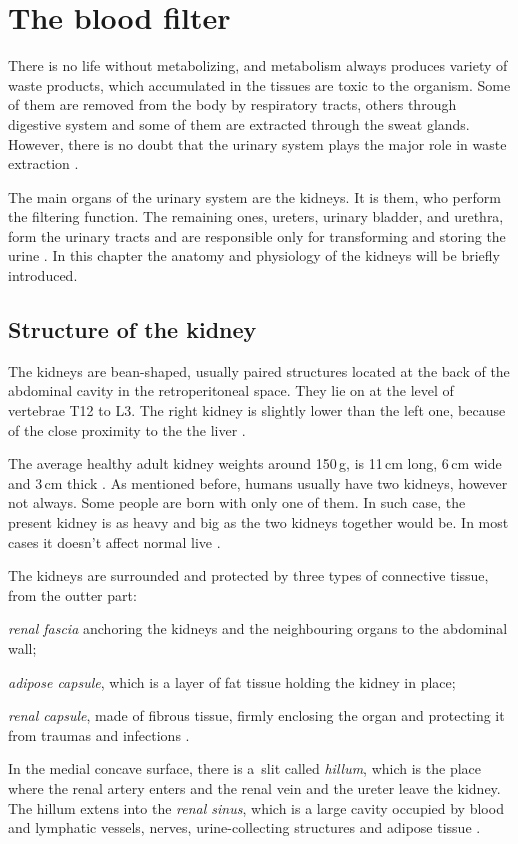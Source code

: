 \chapter{The blood filter}
	
There is no life without metabolizing, and metabolism always produces variety of waste products, which accumulated in the tissues are toxic to the organism. Some of them are removed from the body by respiratory tracts, others through digestive system and some of them are extracted through the sweat glands. However, there is no doubt that the urinary system plays the major role in waste extraction \cite{saladin, health_and_disease}.

The main organs of the urinary system are the kidneys. It is them, who perform the filtering function. The remaining ones,  ureters, urinary bladder, and urethra, form the urinary tracts and are responsible only for transforming and storing the urine \cite{saladin}. In this chapter the anatomy and physiology of the kidneys will be briefly introduced.

\section{Structure of the kidney} 

The kidneys are  bean-shaped, usually paired structures located at the back of the abdominal cavity in the retroperitoneal space. They lie on at the level of vertebrae T12 to L3.
The right kidney is slightly lower than the left one, because of the close proximity to the the liver \cite{saladin, health_and_disease}. 

The average healthy adult kidney weights around 150\,g, is 11\,cm long, 6\,cm wide and 3\,cm thick \cite{kidney_dimensions, saladin}. As mentioned before, humans usually have two kidneys, however not always.  Some people are born with only one of them.  In such case, the present kidney is as heavy and big as the two kidneys together would be. In most cases it doesn't affect normal live \cite{onekidney}. 

The kidneys are surrounded and protected by three types of connective tissue, from the outter part: 
\begin{inparaenum}[(1\upshape)]
\item \textit{renal fascia} anchoring the kidneys and the neighbouring organs to the abdominal wall;
\item \textit{adipose capsule}, which is a layer of fat tissue holding the kidney in place;
\item \textit{renal capsule}, made of fibrous tissue, firmly enclosing the organ and protecting it from traumas and infections \cite{saladin, health_and_disease}.
\end{inparaenum} In the medial concave surface, there is a~slit called \textit{hillum}, which is the place where the  renal  artery enters and the renal vein and the ureter leave the kidney. The hillum extens into the \textit{renal sinus}, which is a large cavity occupied by blood and lymphatic vessels, nerves, urine-collecting structures and adipose tissue \cite{health_and_disease}.

